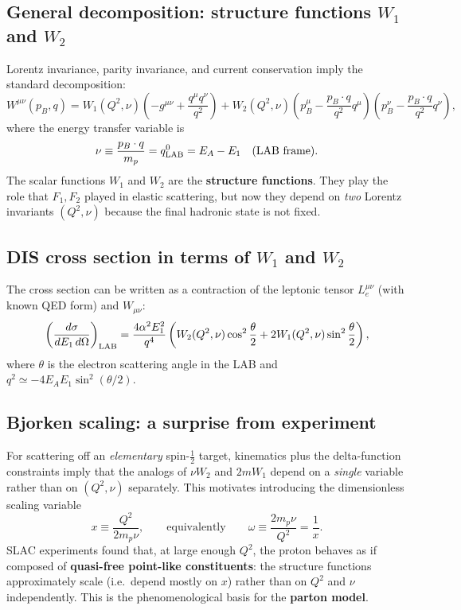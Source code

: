 \subsection{General decomposition: structure functions $W_1$ and $W_2$}
Lorentz invariance, parity invariance, and current conservation imply the standard decomposition:
\begin{equation}
\boxed{
W^{\mu\nu}(p_B,q)
= W_1(Q^2,\nu)\left(-g^{\mu\nu}+\frac{q^\mu q^\nu}{q^2}\right)
+ W_2(Q^2,\nu)\left(p_B^\mu-\frac{p_B\!\cdot q}{q^2}q^\mu\right)
\left(p_B^\nu-\frac{p_B\!\cdot q}{q^2}q^\nu\right),
}
\label{eq:hadronic-tensor-W1W2}
\end{equation}
where the energy transfer variable is
\begin{equation}
\nu \equiv \frac{p_B\cdot q}{m_p} = q^0_{\rm LAB} = E_A-E_1 \quad \text{(LAB frame)}.
\end{equation}
The scalar functions $W_1$ and $W_2$ are the \textbf{structure functions}. They play
the role that $F_1,F_2$ played in elastic scattering, but now they depend on \emph{two}
Lorentz invariants $(Q^2,\nu)$ because the final hadronic state is not fixed.

\subsection{DIS cross section in terms of $W_1$ and $W_2$}
The cross section can be written as a contraction of the leptonic tensor $L^{\mu\nu}_e$
(with known QED form) and $W_{\mu\nu}$:
\begin{equation}
\left(\frac{d\sigma}{dE_1\,d\Omega}\right)_{\rm LAB}
=
\frac{4\alpha^2 E_1^2}{q^4}
\left(
W_2(Q^2,\nu)\cos^2\frac{\theta}{2} + 2W_1(Q^2,\nu)\sin^2\frac{\theta}{2}
\right),
\end{equation}
where $\theta$ is the electron scattering angle in the LAB and $q^2\simeq -4E_AE_1\sin^2(\theta/2)$.

\subsection{Bjorken scaling: a surprise from experiment}
For scattering off an \emph{elementary} spin-$\tfrac12$ target, kinematics plus the
delta-function constraints imply that the analogs of $\nu W_2$ and $2m W_1$ depend
on a \emph{single} variable rather than on $(Q^2,\nu)$ separately. This motivates introducing
the dimensionless scaling variable
\begin{equation}
x \equiv \frac{Q^2}{2m_p \nu},
\qquad\text{equivalently}\qquad
\omega\equiv \frac{2m_p\nu}{Q^2}=\frac{1}{x}.
\end{equation}
SLAC experiments found that, at large enough $Q^2$, the proton behaves as if composed of
\textbf{quasi-free point-like constituents}: the structure functions approximately scale
(i.e.\ depend mostly on $x$) rather than on $Q^2$ and $\nu$ independently. This is the
phenomenological basis for the \textbf{parton model}.

